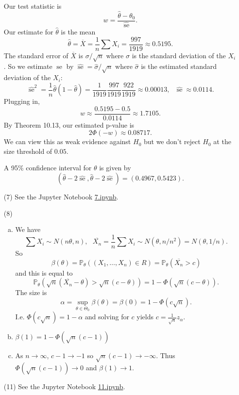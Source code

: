 \documentclass[10pt]{article}
\renewcommand{\P}{\mathbb{P}}
\newcommand{\se}{\operatorname{se}}
\begin{document}
\begin{enumerate}
Our test statistic is
\[
w = \frac{\hat{\theta} - \theta_0}{\widehat{\se}}.
\]
Our estimate for $\hat{\theta}$ is the mean
\[
\hat{\theta}=\overline{X}=\frac{1}{n}\sum X_i = \frac{997}{1919}\approx 0.5195.
\]
The standard error of $\overline{X}$ is $\sigma/\sqrt{n}$ where $\sigma$
is the standard deviation of the $X_i$. So we estimate $\se$ by
$\widehat{\se}=\widehat{\sigma}/\sqrt{n}$ where $\widehat{\sigma}$ is the
estimated standard deviation of the $X_i$:
\[
\widehat{\se}^2= \frac{1}{n} \hat\theta(1-\hat\theta)
= \frac{1}{1919}\frac{997}{1919}\frac{922}{1919} \approx 0.00013,
\ \ \ \widehat{\se} \approx 0.0114.
\]
Plugging in,
\[
w \approx \frac{0.5195 - 0.5}{0.0114} \approx 1.7105.
\]
By Theorem 10.13, our estimated p-value is
\[
2\Phi(-w)\approx 0.08717.
\]
We can view this as weak evidence against $H_0$ but we don't reject $H_0$
at the size threshold of $0.05$.

A 95\% confidence interval for $\theta$ is given by
\[
(\hat{\theta} - 2 \widehat{\se}, \hat{\theta} - 2\widehat{\se})
= (0.4967, 0.5423).
\]

\item[(7)]
See the Jupyter Notebook
\href{https://github.com/ajrasmus/some_of_statistics/blob/main/chapter_10/7.ipynb}{7.ipynb}.

\item[(8)]
\begin{enumerate}[(a)]
\item
We have
\[
\sum X_i \sim N(n\theta, n), \ \ \
\overline{X_n} = \frac{1}{n} \sum X_i \sim N(\theta, n/n^2) = N(\theta, 1/n).
\]
So
\[
\beta(\theta)=\P_\theta((X_1,\ldots,X_n) \in R) = \P_\theta(\overline{X_n} > c)
\]
and this is equal to
\[
\P_\theta(\sqrt{n}(\overline{X_n} - \theta) > \sqrt{n}(c-\theta))
= 1 - \Phi(\sqrt{n}(c-\theta)).
\]
The size is
\[
\alpha = \sup_{\theta \in \Theta_0} \beta(\theta) = \beta(0) =
1- \Phi(c\sqrt{n}).
\]
I.e. $\Phi(c\sqrt{n})=1-\alpha$ and solving for $c$ yields
$c=\frac{1}{\sqrt{n}}z_\alpha$.
\item
$\beta(1) = 1-\Phi(\sqrt{n}(c-1))$

\item
As $n\to \infty$, $c-1\to -1$ so $\sqrt{n}(c-1)\to -\infty$. Thus
\\ $\Phi(\sqrt{n}(c-1))\to 0$ and $\beta(1)\to 1$.
\end{enumerate}

\item[(11)]
See the Jupyter Notebook
\href{https://github.com/ajrasmus/some_of_statistics/blob/main/chapter_10/11.ipynb}{11.ipynb}.


\end{enumerate}
\end{document}

